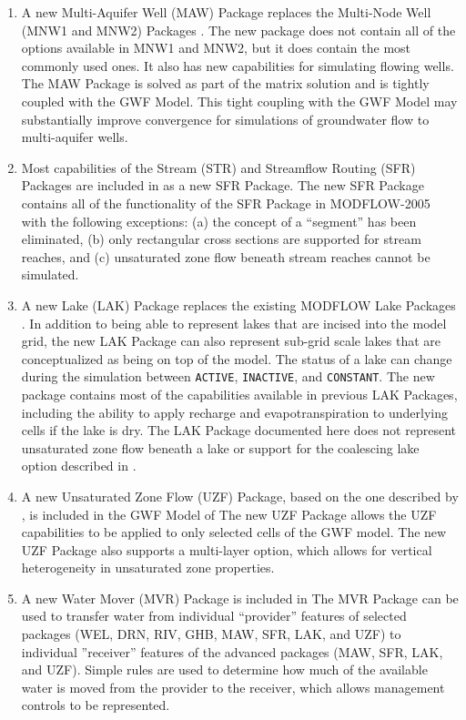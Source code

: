 \begin{enumerate}
\item A new Multi-Aquifer Well (MAW) Package replaces the Multi-Node Well (MNW1 and MNW2) Packages \citep{halford2002, konikow2009}. The new package does not contain all of the options available in MNW1 and MNW2, but it does contain the most commonly used ones.  It also has new capabilities for simulating flowing wells. The MAW Package is solved as part of the matrix solution and is tightly coupled with the GWF Model. This tight coupling with the GWF Model may substantially improve convergence for simulations of groundwater flow to multi-aquifer wells.

\item Most capabilities of the Stream (STR) and Streamflow Routing (SFR) Packages \citep{prudic1989str, modflowsfr1pack, modflowsfr2pack} are included in \mf as a new SFR Package.  The new SFR Package contains all of the functionality of the SFR Package in MODFLOW-2005 with the following exceptions: (a) the concept of a ``segment'' has been eliminated, (b) only rectangular cross sections are supported for stream reaches, and (c) unsaturated zone flow beneath stream reaches cannot be simulated.

\item A new Lake (LAK) Package replaces the existing MODFLOW Lake Packages \citep{modflowlak3pack}. In addition to being able to represent lakes that are incised into the model grid, the new LAK Package can also represent sub-grid scale lakes that are conceptualized as being on top of the model.  The status of a lake can change during the simulation between \texttt{ACTIVE}, \texttt{INACTIVE}, and \texttt{CONSTANT}.  The new package contains most of the capabilities available in previous LAK Packages, including the ability to apply recharge and evapotranspiration to underlying cells if the lake is dry.  The LAK Package documented here does not represent unsaturated zone flow beneath a lake or support for the coalescing lake option described in \cite{modflowlak3pack}. 

\item A new Unsaturated Zone Flow (UZF) Package, based on the one described by \cite{UZF}, is included in the GWF Model of \mfdot The new UZF Package allows the UZF capabilities to be applied to only selected cells of the GWF model. The new UZF Package also supports a multi-layer option, which allows for vertical heterogeneity in unsaturated zone properties.

\item A new Water Mover (MVR) Package is included in \mfdot  The MVR Package can be used to transfer water from individual ``provider'' features of selected packages (WEL, DRN, RIV, GHB, MAW, SFR, LAK, and UZF) to individual ''receiver'' features of the advanced packages (MAW, SFR, LAK, and UZF).  Simple rules are used to determine how much of the available water is moved from the provider to the receiver, which allows management controls to be represented. 


\end{enumerate}
